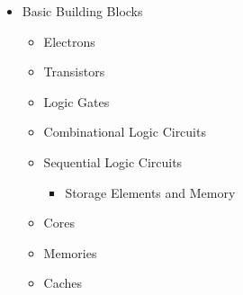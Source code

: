 \begin{itemize}
  \item Basic Building Blocks

    \begin{itemize}

      \item Electrons

      \item Transistors

      \item Logic Gates

      \item Combinational Logic Circuits

      \item Sequential Logic Circuits

        \begin{itemize}

          \item Storage Elements and Memory

        \end{itemize}

      \item Cores

      \item Memories

      \item Caches

    \end{itemize}

\end{itemize}



